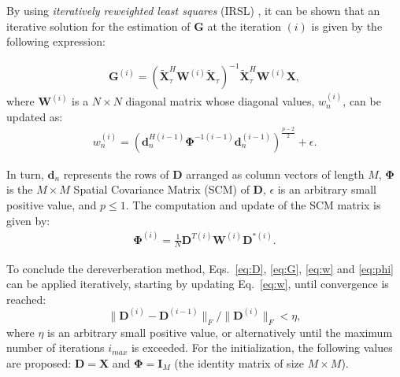 By using \textit{iteratively reweighted least squares} (IRSL) \cite{chartrand2008iteratively}, it can be shown that an iterative solution for the estimation of $\bm{G}$ at the iteration $(i)$ is given by the following expression:

\begin{equation}
\begin{aligned}
	\label{eq:G}
	\bm{G}^{(i)} = ( \tilde{\bm{X}}_{\tau}^H \bm{W}^{(i)} \tilde{\bm{X}}_{\tau} )^{-1} \tilde{\bm{X}}_{\tau}^H \bm{W}^{(i)} \bm{X}, 
\end{aligned}
\end{equation}
 where $\bm{W}^{(i)}$ is a $N \times N$ diagonal matrix whose diagonal values, $w_n^{(i)}$, can be updated as:
\begin{equation}
\begin{aligned}
\label{eq:w}
	w_n^{(i)} = ( \bm{d}_n^{H (i-1)} \bm{\Phi}^{-1 (i-1)} \bm{d}_n^{(i-1)}  )^{ \frac{p-2}{2} } + \epsilon.
\end{aligned}
\end{equation}

In turn, $\bm{d}_n$ represents the rows of $\bm{D}$ arranged as column vectors of length $M$, $\bm{\Phi}$ is the $M \times M$ Spatial Covariance Matrix (SCM) of $\bm{D}$, $\epsilon$ is an arbitrary small positive value, and $p \leq 1$. The computation and update of the SCM matrix is given by:
\begin{equation}
\begin{aligned}
\label{eq:phi}
	\bm{\Phi}^{(i)} = \frac{1}{N} \bm{D}^{T(i)} \bm{W}^{(i)} \bm{D}^{*(i)}.
\end{aligned}
\end{equation}



To conclude the dereverberation method, Eqs.~\ref{eq:D}, \ref{eq:G}, \ref{eq:w} and \ref{eq:phi} can be applied iteratively, starting by updating Eq.~\ref{eq:w}, until convergence is reached: 
\begin{equation}
 \| \bm{D}^{(i)} - \bm{D}^{(i-1)} \|_F / \| \bm{D}^{(i)} \|_F < \eta, 
\end{equation}
where $\eta$ is an arbitrary small positive value, or alternatively until the maximum number of iterations $i_{max}$ is exceeded. For the initialization, the following values are proposed: $\bm{D} = \bm{X}$ and $\bm{\Phi} = \bm{I}_M$ (the identity matrix of size $M \times M$).\\

